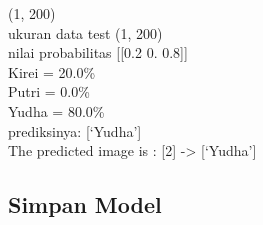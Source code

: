 \documentclass[
  letterpaper,
  DIV=11,
  numbers=noendperiod]{scrreprt}
\begin{document}
\begin{figure}
\begin{minipage}[t]{0.33\linewidth}
{{}

}

\end{minipage}%
%
\begin{minipage}[t]{0.33\linewidth}

{\centering 


}

\end{minipage}%

\end{figure}

(1, 200)\\
ukuran data test (1, 200)\\
nilai probabilitas {[}{[}0.2 0. 0.8{]}{]}\\
Kirei = 20.0\%\\
Putri = 0.0\%\\
Yudha = 80.0\%\\
prediksinya: {[}`Yudha'{]}\\
The predicted image is : {[}2{]} -\textgreater{} {[}`Yudha'{]}

\hypertarget{simpan-model}{%
\subsection*{Simpan Model}\label{simpan-model}}
\end{document}
